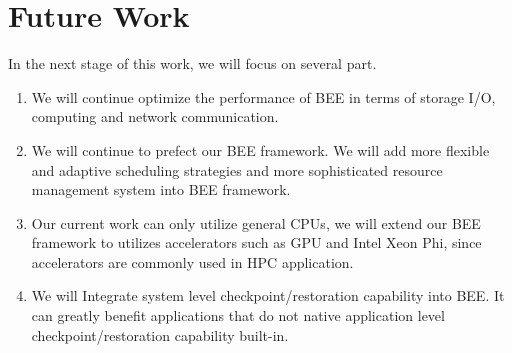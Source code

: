 \section{Future Work}
    \label{sec:discussion}
In the next stage of this work, we will focus on several part. 
\begin{enumerate}

\item We will continue optimize the performance of BEE in terms of storage I/O, computing and network communication. 

\item We will continue to prefect our BEE framework. We will add more flexible and adaptive scheduling strategies and more sophisticated resource management system into BEE framework. 

\item Our current work can only utilize general CPUs, we will extend our BEE framework to utilizes accelerators such as GPU and Intel Xeon Phi, since accelerators are commonly used in HPC application. 

\item We will Integrate system level checkpoint/restoration capability into BEE. It can greatly benefit applications that do not native application level checkpoint/restoration capability built-in.

\end{enumerate}